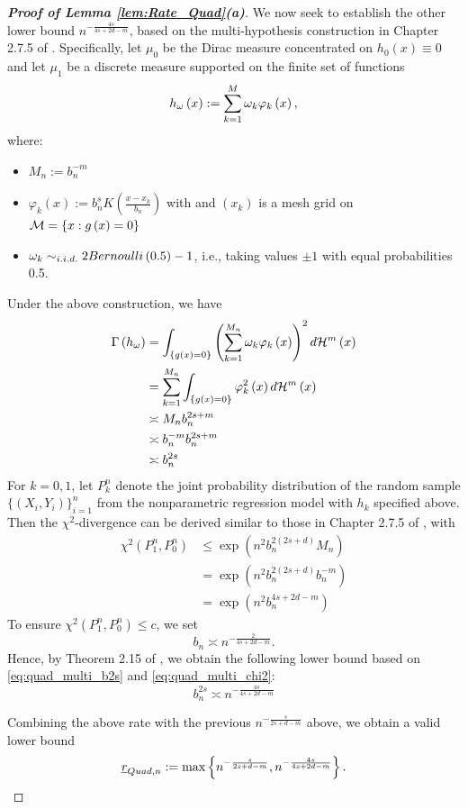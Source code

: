 \documentclass[12pt,american]{article}
\theoremstyle{definition}
\theoremstyle{plain}
\theoremstyle{definition}
\theoremstyle{plain}
\theoremstyle{plain}
\theoremstyle{plain}
\theoremstyle{plain}
\theoremstyle{plain}
\begin{document}
\begin{proof}[\textbf{Proof of Lemma \ref{lem:Rate_Quad}(a)}]
We now seek to establish the other lower bound $n^{-\frac{4s}{4s+2d-m}}$,
based on the multi-hypothesis construction in Chapter 2.7.5 of \cite{Tsybakov2009}. Specifically, let $\mu_{0}$ be the Dirac measure concentrated
on $h_{0}\left(x\right)\equiv0$ and let $\mu_{1}$ be a discrete
measure supported on the finite set of functions
\[
h_{\omega}\left(x\right):=\sum_{k=1}^{M}\omega_{k}\varphi_{k}\left(x\right),
\]
where:
\begin{itemize}
\item $M_{n}:=b_{n}^{-m}$
\item $\varphi_{k}$$\left(x\right):=b_{n}^{s}K\left(\frac{x-x_{k}}{b_{n}}\right)$
with and $\left(x_{k}\right)$ is a mesh grid on ${\cal M}=\left\{ x:g\left(x\right)=0\right\} $
\item $\omega_{k}\sim_{i.i.d.}2Bernoulli\left(0.5\right)-1$, i.e., taking values
$\pm1$ with equal probabilities 0.5.
\end{itemize}
Under the above construction, we have
\begin{align}
\Gamma\left(h_{\omega}\right) & =\int_{\left\{ g\left(x\right)=0\right\} }\left(\sum_{k=1}^{M_{n}}\omega_{k}\varphi_{k}\left(x\right)\right)^{2}d{\cal H}^{m}\left(x\right)\nonumber \\
 & =\sum_{k=1}^{M_{n}}\int_{\left\{ g\left(x\right)=0\right\} }\varphi_{k}^{2}\left(x\right)d{\cal H}^{m}\left(x\right)\nonumber \\
 & \asymp M_{n}b_{n}^{2s+m}\nonumber \\
 & \asymp b_{n}^{-m}b_{n}^{2s+m}\nonumber \\
 & \asymp b_{n}^{2s}\label{eq:quad_multi_b2s}
\end{align}
For $k=0,1$, let $P_{k}^{n}$ denote the joint probability distribution of the random sample $\{(X_{i},Y_{i})\}_{i=1}^{n}$ from the nonparametric
regression model with $h_{k}$ specified above. Then the $\chi^2$-divergence
can be derived similar to those in Chapter 2.7.5 of \cite{Tsybakov2009}, with
\begin{align*}
\chi^{2}\left(P_{1}^{n},P_{0}^{n}\right) & \leq\exp\left(n^{2}b_{n}^{2\left(2s+d\right)}M_{n}\right)\\
 & =\exp\left(n^{2}b_{n}^{2\left(2s+d\right)}b_{n}^{-m}\right)\\
 & =\exp\left(n^{2}b_{n}^{4s+2d-m}\right)
\end{align*}
To ensure $\chi^{2}\left(P_{1}^{n},P_{0}^{n}\right)\leq c$, we set
\begin{equation}
   b_{n}\asymp n^{-\frac{2}{4s+2d-m}}. \label{eq:quad_multi_chi2}
\end{equation}
Hence, by Theorem 2.15 of \cite{Tsybakov2009}, we obtain the following lower bound based on \eqref{eq:quad_multi_b2s} and \eqref{eq:quad_multi_chi2}:
\[
b_{n}^{2s}\asymp n^{-\frac{4s}{4s+2d-m}}
\]

Combining the above rate with the previous $n^{-\frac{s}{2s+d-m}}$ above, we obtain a valid lower bound
\[
\underline{r}_{Quad,n}:=\max\left\{n^{-\frac{s}{2s+d-m}},n^{-\frac{4s}{4s+2d-m}}\right\}.
\]
\end{proof}
\end{document}
